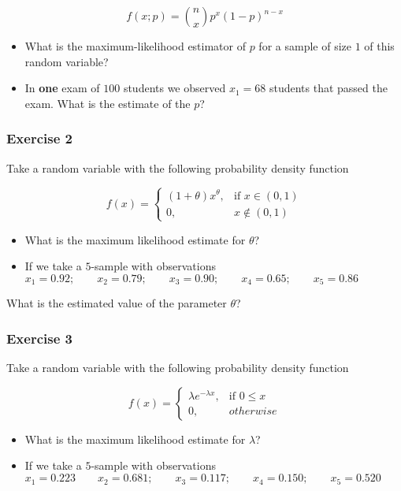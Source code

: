 \documentclass[
]{book}
\begin{document}
\[f(x; p)=\binom n x p^x(1-p)^{n-x}\]

\begin{itemize}
\item
  What is the maximum-likelihood estimator of \(p\) for a sample of size \(1\) of this random variable?
\item
  In \textbf{one} exam of \(100\) students we observed \(x_1=68\) students that passed the exam. What is the estimate of the \(p\)?
\end{itemize}

\hypertarget{exercise-2-7}{%
\subsubsection{Exercise 2}\label{exercise-2-7}}

Take a random variable with the following probability density function

\[
f(x)=
\begin{cases}
    (1+\theta)x^\theta,& \text{if } x\in (0,1)\\
    0,&  x\notin (0,1)
\end{cases}
\]

\begin{itemize}
\item
  What is the maximum likelihood estimate for \(\theta\)?
\item
  If we take a \(5\)-sample with observations
  \(x_1 = 0.92; \qquad x_2 = 0.79; \qquad x_3 = 0.90; \qquad x_4 = 0.65; \qquad x_5 = 0.86\)
\end{itemize}

What is the estimated value of the parameter \(\theta\)?

\hypertarget{exercise-3-4}{%
\subsubsection{Exercise 3}\label{exercise-3-4}}

Take a random variable with the following probability density function

\[
    f(x)= 
\begin{cases}
    \lambda e^{-\lambda x},& \text{if } 0 \leq x\\
    0,& otherwise 
\end{cases}
\]

\begin{itemize}
\item
  What is the maximum likelihood estimate for \(\lambda\)?
\item
  If we take a \(5\)-sample with observations
  \(x_1 = 0.223 \qquad x_2 = 0.681; \qquad x_3 = 0.117; \qquad x_4 = 0.150; \qquad x_5 = 0.520\)
\end{itemize}
\end{document}
